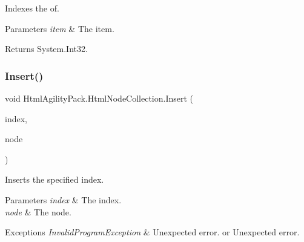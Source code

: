 Indexes the of. 


\begin{DoxyParams}{Parameters}
{\em item} & The item.\\
\hline
\end{DoxyParams}
\begin{DoxyReturn}{Returns}
System.\+Int32.
\end{DoxyReturn}
\mbox{\label{class_html_agility_pack_1_1_html_node_collection_a0097b0c06138a7baabf08048bce9d1f6}} 
\subsubsection{\texorpdfstring{Insert()}{Insert()}}
{\footnotesize\ttfamily void Html\+Agility\+Pack.\+Html\+Node\+Collection.\+Insert (\begin{DoxyParamCaption}\item[{int}]{index,  }\item[{\hyperlink{class_html_agility_pack_1_1_html_node}{Html\+Node}}]{node }\end{DoxyParamCaption})\hspace{0.3cm}{\ttfamily [inline]}}



Inserts the specified index. 


\begin{DoxyParams}{Parameters}
{\em index} & The index.\\
\hline
{\em node} & The node.\\
\hline
\end{DoxyParams}

\begin{DoxyExceptions}{Exceptions}
{\em Invalid\+Program\+Exception} & Unexpected error. or Unexpected error. \\
\hline
\end{DoxyExceptions}
\mbox{\label{class_html_agility_pack_1_1_html_node_collection_a03326670b5a9221a648c76136371a5a6}} 
